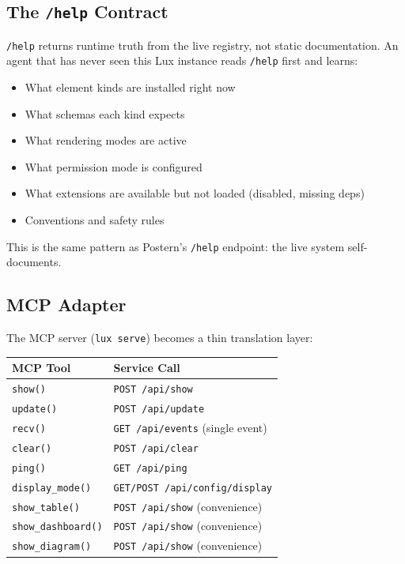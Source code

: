 \documentclass[a4paper,10pt]{article}
\newcommand{\api}[1]{\texttt{#1}}
\begin{document}
\subsection{The \api{/help} Contract}

\api{/help} returns runtime truth from the live registry, not
static documentation.  An agent that has never seen this Lux
instance reads \api{/help} first and learns:

\begin{itemize}[nosep]
  \item What element kinds are installed right now
  \item What schemas each kind expects
  \item What rendering modes are active
  \item What permission mode is configured
  \item What extensions are available but not loaded (disabled,
    missing deps)
  \item Conventions and safety rules
\end{itemize}

This is the same pattern as Postern's \api{/help} endpoint:
the live system self-documents.

\subsection{MCP Adapter}

The MCP server (\texttt{lux serve}) becomes a thin translation
layer:

\begin{center}
\begin{tabular}{@{}ll@{}}
\toprule
\textbf{MCP Tool} & \textbf{Service Call} \\
\midrule
\texttt{show()}          & \api{POST /api/show} \\
\texttt{update()}        & \api{POST /api/update} \\
\texttt{recv()}          & \api{GET /api/events} (single event) \\
\texttt{clear()}         & \api{POST /api/clear} \\
\texttt{ping()}          & \api{GET /api/ping} \\
\texttt{display\_mode()} & \api{GET/POST /api/config/display} \\
\texttt{show\_table()}   & \api{POST /api/show} (convenience) \\
\texttt{show\_dashboard()} & \api{POST /api/show} (convenience) \\
\texttt{show\_diagram()} & \api{POST /api/show} (convenience) \\
\bottomrule
\end{tabular}
\end{center}
\end{document}
